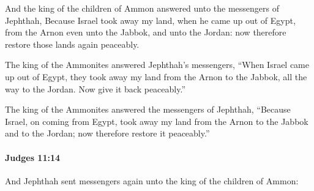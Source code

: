 			\begin{versebox}
					\item[BHS] 
					\item[ASV] And the king of the children of Ammon answered unto the messengers of Jephthah, Because Israel took away my land, when he came up out of Egypt, from the Arnon even unto the Jabbok, and unto the Jordan: now therefore restore those lands again peaceably.
					\item[NIV] The king of the Ammonites answered Jephthah’s messengers, “When Israel came up out of Egypt, they took away my land from the Arnon to the Jabbok, all the way to the Jordan. Now give it back peaceably.”
					\item[NRSV] The king of the Ammonites answered the messengers of Jephthah, “Because Israel, on coming from Egypt, took away my land from the Arnon to the Jabbok and to the Jordan; now therefore restore it peaceably.”
			\end{versebox}

		\paragraph{Judges 11:14} %
			\label{JUDGES-11-14}

			And Jephthah sent messengers again unto the king of the children of Ammon:

